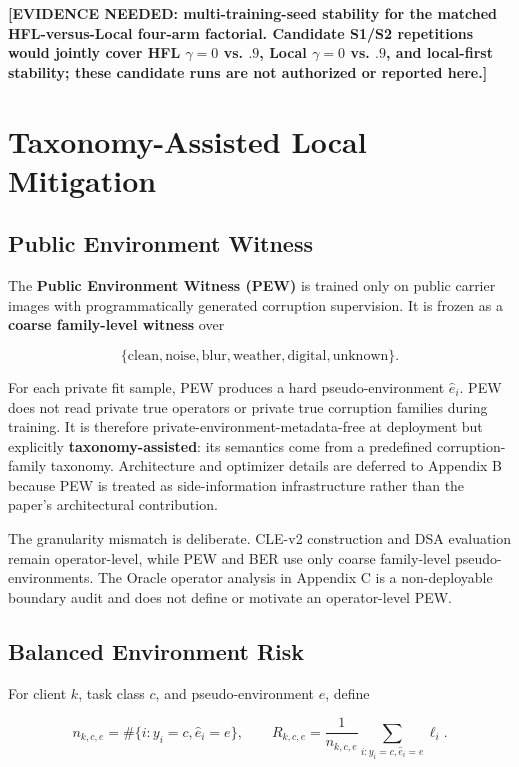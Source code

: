 \documentclass[10pt,twocolumn]{article}
\begin{document}
\textbf{[EVIDENCE NEEDED: multi-training-seed stability for the matched HFL-versus-Local four-arm factorial. Candidate S1/S2 repetitions would jointly cover HFL \(\gamma=0\) vs. \(.9\), Local \(\gamma=0\) vs. \(.9\), and local-first stability; these candidate runs are not authorized or reported here.]}

\section{Taxonomy-Assisted Local Mitigation}

\subsection{Public Environment Witness}

The \textbf{Public Environment Witness (PEW)} is trained only on public carrier images with programmatically generated corruption supervision. It is frozen as a \textbf{coarse family-level witness} over

\[
\{\text{clean},\text{noise},\text{blur},\text{weather},\text{digital},\text{unknown}\}.
\]

For each private fit sample, PEW produces a hard pseudo-environment \(\hat e_i\). PEW does not read private true operators or private true corruption families during training. It is therefore private-environment-metadata-free at deployment but explicitly \textbf{taxonomy-assisted}: its semantics come from a predefined corruption-family taxonomy. Architecture and optimizer details are deferred to Appendix B because PEW is treated as side-information infrastructure rather than the paper's architectural contribution.

The granularity mismatch is deliberate. CLE-v2 construction and DSA evaluation remain operator-level, while PEW and BER use only coarse family-level pseudo-environments. The Oracle operator analysis in Appendix C is a non-deployable boundary audit and does not define or motivate an operator-level PEW.

\subsection{Balanced Environment Risk}

For client \(k\), task class \(c\), and pseudo-environment \(e\), define

\[
n_{k,c,e}=\#\{i:y_i=c,\hat e_i=e\},
\qquad
R_{k,c,e}=\frac1{n_{k,c,e}}\sum_{i:y_i=c,\hat e_i=e}\ell_i.
\]
\end{document}
